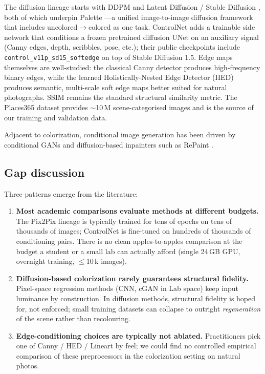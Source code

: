 \documentclass[conference]{IEEEtran}
\begin{document}
The diffusion lineage starts with DDPM \cite{ho2020ddpm} and Latent
Diffusion / Stable Diffusion \cite{rombach2022high}, both of which
underpin Palette \cite{saharia2022palette}---a unified
image-to-image diffusion framework that includes uncolored$\to$colored
as one task. ControlNet \cite{zhang2023adding} adds a trainable side
network that conditions a frozen pretrained diffusion UNet on an
auxiliary signal (Canny edges, depth, scribbles, pose, etc.); their
public checkpoints include \texttt{control\_v11p\_sd15\_softedge} on
top of Stable Diffusion 1.5. Edge maps themselves are well-studied:
the classical Canny detector \cite{canny1986computational} produces
high-frequency binary edges, while the learned Holistically-Nested Edge
Detector (HED) \cite{xie2015holistically} produces semantic,
multi-scale soft edge maps better suited for natural photographs.
SSIM \cite{wang2004image} remains the standard structural similarity
metric. The Places365 dataset \cite{zhou2017places} provides
$\sim$10\,M scene-categorised images and is the source of our
training and validation data.

Adjacent to colorization, conditional image generation has been driven
by conditional GANs \cite{mirza2014conditional} and diffusion-based
inpainters such as RePaint \cite{lugmayr2022repaint}.

\subsection{Gap discussion}\label{sec:gap}
Three patterns emerge from the literature:

\begin{enumerate}
  \item \textbf{Most academic comparisons evaluate methods at different
        budgets.} The Pix2Pix lineage is typically trained for tens of
        epochs on tens of thousands of images; ControlNet is fine-tuned
        on hundreds of thousands of conditioning pairs. There is no
        clean apples-to-apples comparison at the budget a student or a
        small lab can actually afford (single 24\,GB GPU, overnight
        training, $\le$10\,k images).
  \item \textbf{Diffusion-based colorization rarely guarantees
        structural fidelity.} Pixel-space regression methods (CNN,
        cGAN in Lab space) keep input luminance by construction. In
        diffusion methods, structural fidelity is hoped for, not
        enforced; small training datasets can collapse to outright
        \emph{regeneration} of the scene rather than recolouring.
  \item \textbf{Edge-conditioning choices are typically not ablated.}
        Practitioners pick one of Canny / HED / Lineart by feel; we
        could find no controlled empirical comparison of these
        preprocessors in the colorization setting on natural photos.
\end{enumerate}
\end{document}
